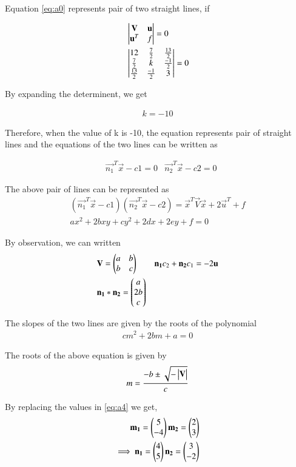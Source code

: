 \documentclass[journal,12pt,twocolumn]{IEEEtran}
\begin{document}
Equation \eqref{eq:a0} represents pair of two straight lines, if 

\begin{align}
&\begin{vmatrix}\mathbf{V} & \mathbf{u} \\ \mathbf{u}^T & f\end{vmatrix} = 0 \\
&\begin{vmatrix}12 & \frac{7}{2} & \frac{13}{2} \\ \frac{7}{2} & k & \frac{-1}{2} \\ \frac{13}{2} & \frac{-1}{2} & 3\end{vmatrix} = 0
\end{align}

By expanding the determinent, we get 

\begin{align}
k = -10 
\end{align}

Therefore, when the value of k is -10, the equation represents pair of straight lines and the equations of the two lines can be written as 

\begin{align}
&\vec{n_1}^T\vec{x} - c1 = 0 
&\vec{n_2}^T\vec{x} - c2 = 0
\label{eq:a3}
\end{align}

The above pair of lines can be represnted as 
\begin{multline}
(\vec{n_1}^T\vec{x} - c1)(\vec{n_2}^T\vec{x} - c2) = \vec{x}^T\vec{V}\vec{x} + 2\vec{u}^T + f  \\
ax^2+2bxy+cy^2+2dx+2ey+f=0
\end{multline}

By observation, we can written 
\begin{align}
&\mathbf{V} = \begin{pmatrix}a & b \\ b & c\end{pmatrix}
&\mathbf{n_1}c_2 + \mathbf{n_2}c_1 =  -2\mathbf{u}   \\ 
&\mathbf{n_1}*\mathbf{n_2}  = \begin{pmatrix}a \\ 2b \\ c\end{pmatrix} 
\end{align}

The slopes of the two lines are given by the roots of the polynomial 
\begin{align}
cm^2+2bm+a = 0 
\end{align}

The roots of the above equation is given by
\begin{align}
m = \frac{-b\pm{\sqrt{-\ensuremath{\begin{vmatrix}\mathbf{V}\end{vmatrix}}}}}{c}
\label{eq:a4}
\end{align}

By replacing the values in \eqref{eq:a4} we get,
\begin{align}
\mathbf{m_1} = \begin{pmatrix}5 \\ -4\end{pmatrix}
\mathbf{m_2} = \begin{pmatrix}2 \\ 3\end{pmatrix} \\
\implies\mathbf{n_1} = \begin{pmatrix}4 \\ 5\end{pmatrix} 
\mathbf{n_2} = \begin{pmatrix}3 \\ -2\end{pmatrix}
\label{eq:a5}
\end{align}
\end{document}
